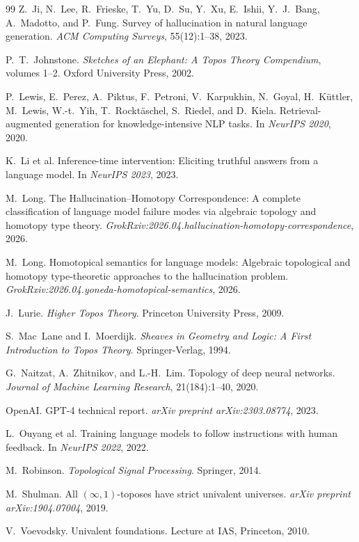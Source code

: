 \documentclass[11pt,a4paper]{article}
\theoremstyle{plain}
\theoremstyle{definition}
\theoremstyle{remark}
\begin{document}
\begin{thebibliography}{99}
Z.~Ji, N.~Lee, R.~Frieske, T.~Yu, D.~Su, Y.~Xu, E.~Ishii, Y.~J.~Bang, A.~Madotto, and P.~Fung.
\newblock Survey of hallucination in natural language generation.
\newblock \emph{ACM Computing Surveys}, 55(12):1--38, 2023.

P.~T.~Johnstone.
\newblock \emph{Sketches of an Elephant: A Topos Theory Compendium}, volumes 1--2.
\newblock Oxford University Press, 2002.

P.~Lewis, E.~Perez, A.~Piktus, F.~Petroni, V.~Karpukhin, N.~Goyal, H.~K\"uttler, M.~Lewis, W.-t.~Yih, T.~Rockt\"aschel, S.~Riedel, and D.~Kiela.
\newblock Retrieval-augmented generation for knowledge-intensive NLP tasks.
\newblock In \emph{NeurIPS 2020}, 2020.

K.~Li et al.
\newblock Inference-time intervention: Eliciting truthful answers from a language model.
\newblock In \emph{NeurIPS 2023}, 2023.

M.~Long.
\newblock The Hallucination--Homotopy Correspondence: A complete classification of language model failure modes via algebraic topology and homotopy type theory.
\newblock \emph{GrokRxiv:2026.04.hallucination-homotopy-correspondence}, 2026.

M.~Long.
\newblock Homotopical semantics for language models: Algebraic topological and homotopy type-theoretic approaches to the hallucination problem.
\newblock \emph{GrokRxiv:2026.04.yoneda-homotopical-semantics}, 2026.

J.~Lurie.
\newblock \emph{Higher Topos Theory}.
\newblock Princeton University Press, 2009.

S.~Mac~Lane and I.~Moerdijk.
\newblock \emph{Sheaves in Geometry and Logic: A First Introduction to Topos Theory}.
\newblock Springer-Verlag, 1994.

G.~Naitzat, A.~Zhitnikov, and L.-H.~Lim.
\newblock Topology of deep neural networks.
\newblock \emph{Journal of Machine Learning Research}, 21(184):1--40, 2020.

OpenAI.
\newblock GPT-4 technical report.
\newblock \emph{arXiv preprint arXiv:2303.08774}, 2023.

L.~Ouyang et al.
\newblock Training language models to follow instructions with human feedback.
\newblock In \emph{NeurIPS 2022}, 2022.

M.~Robinson.
\newblock \emph{Topological Signal Processing}.
\newblock Springer, 2014.

M.~Shulman.
\newblock All $(\infty,1)$-toposes have strict univalent universes.
\newblock \emph{arXiv preprint arXiv:1904.07004}, 2019.

V.~Voevodsky.
\newblock Univalent foundations.
\newblock Lecture at IAS, Princeton, 2010.

\end{thebibliography}
\end{document}
